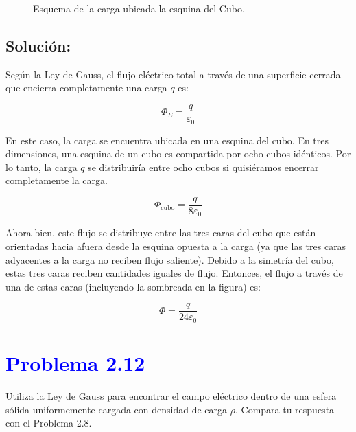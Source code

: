 \documentclass[12pt]{article}
\newcommand{\question}[1]{\textcolor{blue}{\textbf{#1}}}
\begin{document}
\begin{figure}[ht]
    \begin{center}
\end{center}
    \label{fig:figura2.17}
\caption{Esquema de la carga ubicada la esquina del Cubo.}
\end{figure}


\bigskip
\subsection*{Solución:}

Según la Ley de Gauss, el flujo eléctrico total a través de una superficie cerrada que encierra completamente una carga \( q \) es:

\[
\Phi_E = \frac{q}{\varepsilon_0}
\]

En este caso, la carga se encuentra ubicada en una esquina del cubo. En tres dimensiones, una esquina de un cubo es compartida por ocho cubos idénticos. Por lo tanto, la carga \( q \) se distribuiría entre ocho cubos si quisiéramos encerrar completamente la carga.

\[
\Phi_{\text{cubo}} = \frac{q}{8\varepsilon_0}
\]

Ahora bien, este flujo se distribuye entre las tres caras del cubo que están orientadas hacia afuera desde la esquina opuesta a la carga (ya que las tres caras adyacentes a la carga no reciben flujo saliente). Debido a la simetría del cubo, estas tres caras reciben cantidades iguales de flujo. Entonces, el flujo a través de una de estas caras (incluyendo la sombreada en la figura) es:

\[
\boxed{\Phi = \frac{q}{24\varepsilon_0}}
\]

\section*{\question{ Problema 2.12}} 
 Utiliza la Ley de Gauss para encontrar el campo eléctrico dentro de una esfera sólida uniformemente cargada con densidad de carga \( \rho \). Compara tu respuesta con el Problema 2.8.
\end{document}

